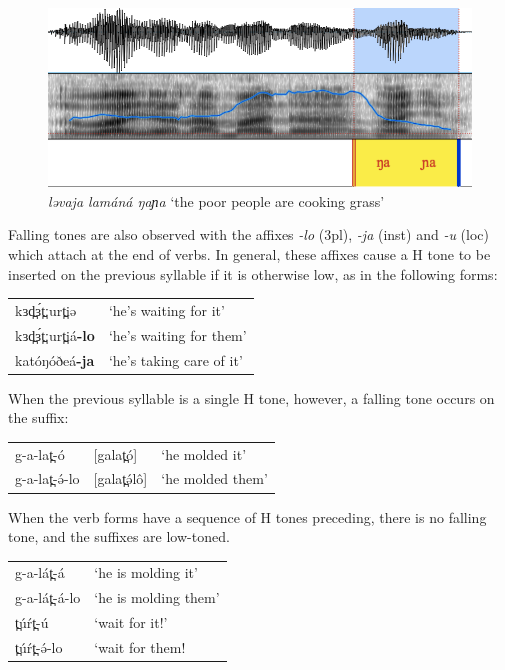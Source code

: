 \begin{figure}
  \includegraphics[width=\linewidth]{figures/fig-ch4-2.png}
  \caption{\textit{ləvaja lamáná ŋaɲa} ‘the poor people are cooking grass’}
  \label{fig:4-2}
\end{figure}

Falling tones are also observed with the affixes \textit{-lo} (3pl), \textit{-ja} (inst) and \textit{-u} (loc) which attach at the end of verbs. In general, these affixes cause a H tone to be inserted on the previous syllable if it is otherwise low, as in the following forms:

\ea
\begin{tabular}[t]{ll}
kɜd̪ɜ́t̪ːurt̪iə 	&	‘he’s waiting for it’\\
kɜd̪ɜ́t̪ːurt̪iá\textbf{-lo} 	&	‘he’s waiting for them’\\
katóŋóðeá\textbf{-ja} 	&	‘he’s taking care of it’\\
\end{tabular}
\z

When the previous syllable is a single H tone, however, a falling tone occurs on the suffix:

\ea
\begin{tabular}[t]{lll}
g-a-lat̪-ó 		&	[galat̪ó]	&	‘he molded it’\\
g-a-lat̪-ə́-lo 	&	[galat̪ə́lô]	&	‘he molded them’\\
\end{tabular}
\z

When the verb forms have a sequence of H tones preceding, there is no falling tone, and the suffixes are low-toned. 
\ea
\begin{tabular}[t]{ll}
g-a-lát̪-á 		&	‘he is molding it’ \\
g-a-lát̪-á-lo 	&	‘he is molding them’ \\
t̪úŕt̪-ú			&	‘wait for it!’ \\
t̪úŕt̪-ə́-lo 		&	‘wait for them! \\
\end{tabular}
\z

